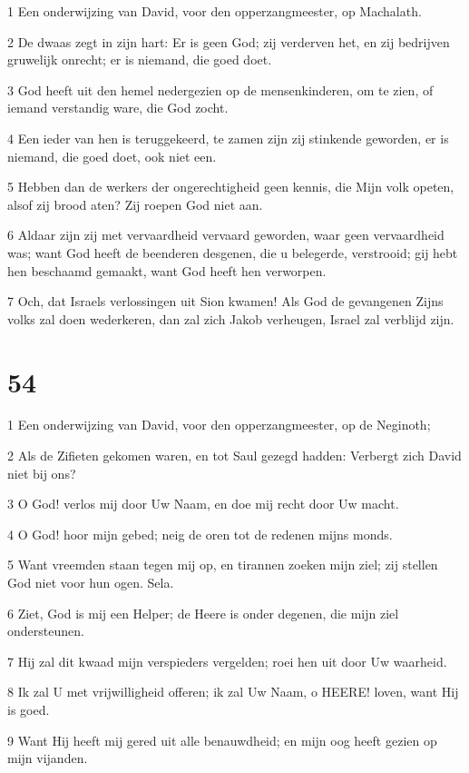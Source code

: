 \par 1 Een onderwijzing van David, voor den opperzangmeester, op Machalath.
\par 2 De dwaas zegt in zijn hart: Er is geen God; zij verderven het, en zij bedrijven gruwelijk onrecht; er is niemand, die goed doet.
\par 3 God heeft uit den hemel nedergezien op de mensenkinderen, om te zien, of iemand verstandig ware, die God zocht.
\par 4 Een ieder van hen is teruggekeerd, te zamen zijn zij stinkende geworden, er is niemand, die goed doet, ook niet een.
\par 5 Hebben dan de werkers der ongerechtigheid geen kennis, die Mijn volk opeten, alsof zij brood aten? Zij roepen God niet aan.
\par 6 Aldaar zijn zij met vervaardheid vervaard geworden, waar geen vervaardheid was; want God heeft de beenderen desgenen, die u belegerde, verstrooid; gij hebt hen beschaamd gemaakt, want God heeft hen verworpen.
\par 7 Och, dat Israels verlossingen uit Sion kwamen! Als God de gevangenen Zijns volks zal doen wederkeren, dan zal zich Jakob verheugen, Israel zal verblijd zijn.

\chapter{54}

\par 1 Een onderwijzing van David, voor den opperzangmeester, op de Neginoth;
\par 2 Als de Zifieten gekomen waren, en tot Saul gezegd hadden: Verbergt zich David niet bij ons?
\par 3 O God! verlos mij door Uw Naam, en doe mij recht door Uw macht.
\par 4 O God! hoor mijn gebed; neig de oren tot de redenen mijns monds.
\par 5 Want vreemden staan tegen mij op, en tirannen zoeken mijn ziel; zij stellen God niet voor hun ogen. Sela.
\par 6 Ziet, God is mij een Helper; de Heere is onder degenen, die mijn ziel ondersteunen.
\par 7 Hij zal dit kwaad mijn verspieders vergelden; roei hen uit door Uw waarheid.
\par 8 Ik zal U met vrijwilligheid offeren; ik zal Uw Naam, o HEERE! loven, want Hij is goed.
\par 9 Want Hij heeft mij gered uit alle benauwdheid; en mijn oog heeft gezien op mijn vijanden.

